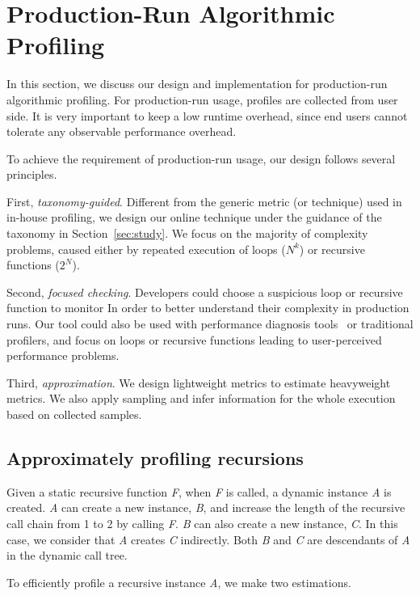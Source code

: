 \newpage
\section{Production-Run Algorithmic Profiling}
\label{sec:online}

In this section, we discuss our design and 
implementation for production-run algorithmic profiling. 
For production-run usage, profiles are collected from user side.
It is very important to keep a low runtime overhead, since
end users cannot tolerate any observable performance overhead. 

To achieve the requirement of production-run usage,
our design follows several principles. 

First, \textit{taxonomy-guided}. 
Different from the generic metric (or technique) used in in-house profiling,
we design our online technique 
under the guidance of the taxonomy in Section~\ref{sec:study}.
We focus on the majority of complexity problems, 
caused either by repeated execution of loops ($N^k$)
or recursive functions ($2^N$).  

Second, \textit{focused checking}.
Developers could choose a suspicious loop or recursive function to monitor
In order to better understand their complexity in production runs.
Our tool could also be used with performance diagnosis tools~\cite{SongOOPSLA2014} 
or traditional profilers,
and focus on loops or recursive functions leading 
to user-perceived performance problems.

Third, \textit{approximation}. 
We design lightweight metrics to estimate heavyweight metrics.
We also apply sampling and infer information for the whole 
execution based on collected samples.


\subsection{Approximately profiling recursions}

Given a static recursive function \textit{F},
when \textit{F} is called, 
a dynamic instance \textit{A} is created.
\textit{A} can create a new instance, \textit{B}, and increase 
the length of the recursive call chain from 1 to 2 by calling \textit{F}.
\textit{B} can also create a new instance, \textit{C}.
In this case, we consider that \textit{A} creates \textit{C} indirectly.
Both \textit{B} and \textit{C} are descendants of 
\textit{A} in the dynamic call tree. 

To efficiently profile a recursive instance \textit{A}, 
we make two estimations.



